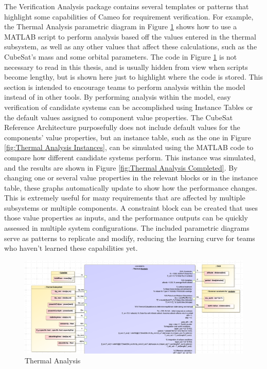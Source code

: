 The Verification Analysis package contains several templates or patterns that highlight some capabilities of Cameo for requirement verification. For example, the Thermal Analysis parametric diagram in Figure \ref{fig:Thermal Analysis} shows how to use a MATLAB script to perform analysis based off the values entered in the thermal subsystem, as well as any other values that affect these calculations, such as the CubeSat's mass and some orbital parameters. The code in Figure \ref{fig:Thermal Analysis} is not necessary to read in this thesis, and is usually hidden from view when scripts become lengthy, but is shown here just to highlight where the code is stored. This section is intended to encourage teams to perform analysis within the model instead of in other tools. By performing analysis within the model, easy verification of candidate systems can be accomplished using Instance Tables or the default values assigned to component value properties. The CubeSat Reference Architecture purposefully does not include default values for the components' value properties, but an instance table, such as the one in Figure \ref{fig:Thermal Analysis Instances}, can be simulated using the MATLAB code to compare how different candidate systems perform. This instance was simulated, and the results are shown in Figure \ref{fig:Thermal Analysis Completed}. By changing one or several value properties in the relevant blocks or in the instance table, these graphs automatically update to show how the performance changes. This is extremely useful for many requirements that are affected by multiple subsystems or multiple components. A constraint block can be created that uses those value properties as inputs, and the performance outputs can be quickly assessed in multiple system configurations. The included parametric diagrams serve as patterns to replicate and modify, reducing the learning curve for teams who haven't learned these capabilities yet. 

\begin{figure}[H]
    \centering
    \includegraphics[scale=0.4, angle=90]{Thesis/Analysis_and_Results/Analysis and Results Figures/Thermal Analysis.png}
    \caption{Thermal Analysis}
    \label{fig:Thermal Analysis}
\end{figure}


